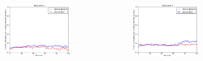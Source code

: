 \documentclass[english]{beamer}
\begin{document}
\begin{frame}
\begin{columns}[t]
        \vspace{-4ex}
        \begin{figure}
            \includegraphics[width=0.85\textwidth]{figures/Complex_hydrophobic_core/hydrophobic_cont_structure2.pdf}  
        \end{figure}      
        \vspace{-5ex}
        \begin{figure}
            \includegraphics[width=0.85\textwidth]{figures/Complex_hydrophobic_core/hydrophobic_cont_structure4.pdf}  
        \end{figure}       

    \end{columns}   
    
\end{frame}       
 
\end{document}
